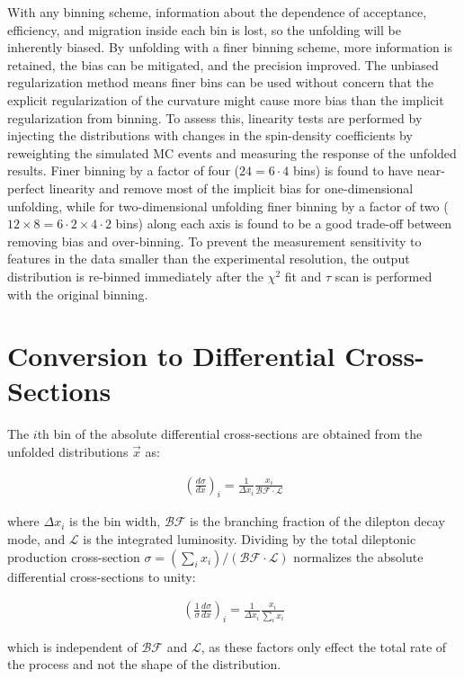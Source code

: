With any binning scheme, information about the dependence of acceptance, efficiency, and migration inside each bin is lost, so the unfolding will be inherently biased.
By unfolding with a finer binning scheme, more information is retained, the bias can be mitigated, and the precision improved.
The unbiased regularization method means finer bins can be used without concern that the explicit regularization of the curvature might cause more bias than the implicit regularization from binning.
To assess this, linearity tests are performed by injecting the distributions with changes in the spin-density coefficients by reweighting the simulated MC events and measuring the response of the unfolded results.
Finer binning by a factor of four ($24 = 6 \cdot 4$ bins) is found to have near-perfect linearity and remove most of the implicit bias for one-dimensional unfolding, while for two-dimensional unfolding finer binning by a factor of two ($12 \times 8 = 6 \cdot 2 \times 4 \cdot 2$ bins) along each axis is found to be a good trade-off between removing bias and over-binning.
To prevent the measurement sensitivity to features in the data smaller than the experimental resolution, the output distribution is re-binned immediately after the $\chi^2$ fit and $\tau$ scan is performed with the original binning.

\section{Conversion to Differential Cross-Sections}
The $i$th bin of the absolute differential cross-sections are obtained from the unfolded distributions $\vec{x}$ as:
\begin{linenomath*}
\begin{align}
(\frac{d\sigma}{dx})_i = \frac{1}{\Delta x_i} \frac{x_i}{\mathcal{BF} \cdot \mathcal{L}} 
\end{align}
\end{linenomath*}
where $\Delta x_i$ is the bin width, $\mathcal{BF}$ is the branching fraction of the \ttbar dilepton decay mode, and $\mathcal{L}$ is the integrated luminosity.
Dividing by the total dileptonic \ttbar production cross-section $\sigma =  (\sum_i x_i) / (\mathcal{BF} \cdot \mathcal{L})$ normalizes the absolute differential cross-sections to unity:
\begin{linenomath*}
\begin{align}
(\frac{1}{\sigma} \frac{d\sigma}{dx})_i = \frac{1}{\Delta x_i} \frac{x_i}{\sum_i x_i} 
\end{align}
\end{linenomath*}
which is independent of $\mathcal{BF}$ and $\mathcal{L}$, as these factors only effect the total rate of the process and not the shape of the distribution.



